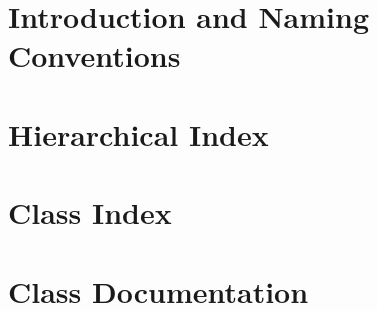\chapter{Introduction and Naming Conventions}
\label{index}\hypertarget{index}{}
\chapter{Hierarchical Index}

\chapter{Class Index}

\chapter{Class Documentation}






















\label{Sec:AppendixPatternI}














